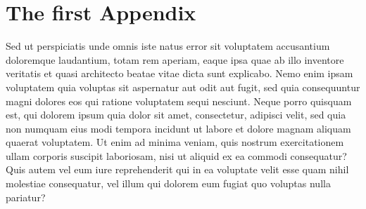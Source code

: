 \chapter{The first Appendix}
    Sed ut perspiciatis unde omnis iste natus error sit voluptatem accusantium doloremque
    laudantium, totam rem aperiam, eaque ipsa quae ab illo inventore veritatis et quasi
    architecto beatae vitae dicta sunt explicabo. Nemo enim ipsam voluptatem quia voluptas
    sit aspernatur aut odit aut fugit, sed quia consequuntur magni dolores eos qui ratione
    voluptatem sequi nesciunt. Neque porro quisquam est, qui dolorem ipsum quia dolor sit
    amet, consectetur, adipisci velit, sed quia non numquam eius modi tempora incidunt ut
    labore et dolore magnam aliquam quaerat voluptatem. Ut enim ad minima veniam, quis
    nostrum exercitationem ullam corporis suscipit laboriosam, nisi ut aliquid ex ea commodi
    consequatur? Quis autem vel eum iure reprehenderit qui in ea voluptate velit esse quam nihil
    molestiae consequatur, vel illum qui dolorem eum fugiat quo voluptas nulla pariatur?
